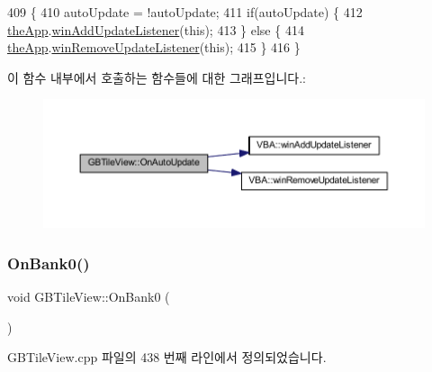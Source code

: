 \begin{DoxyCode}
409 \{
410   autoUpdate = !autoUpdate;
411   \textcolor{keywordflow}{if}(autoUpdate) \{
412     \mbox{\hyperlink{_v_b_a_8cpp_a8095a9d06b37a7efe3723f3218ad8fb3}{theApp}}.\mbox{\hyperlink{class_v_b_a_af0712f70a90d023ab8327a366be08174}{winAddUpdateListener}}(\textcolor{keyword}{this});
413   \} \textcolor{keywordflow}{else} \{
414     \mbox{\hyperlink{_v_b_a_8cpp_a8095a9d06b37a7efe3723f3218ad8fb3}{theApp}}.\mbox{\hyperlink{class_v_b_a_a2d31a0656df2230310aa8dc9e3a735d3}{winRemoveUpdateListener}}(\textcolor{keyword}{this});    
415   \}  
416 \}
\end{DoxyCode}
이 함수 내부에서 호출하는 함수들에 대한 그래프입니다.\+:
\nopagebreak
\begin{figure}[H]
\begin{center}
\leavevmode
\includegraphics[width=350pt]{class_g_b_tile_view_ad31fb32f27279e00c296717013144d33_cgraph}
\end{center}
\end{figure}
\mbox{\label{class_g_b_tile_view_a35e281e40e9fd8867f04a01595f54ef2}} 
\subsubsection{\texorpdfstring{On\+Bank0()}{OnBank0()}}
{\footnotesize\ttfamily void G\+B\+Tile\+View\+::\+On\+Bank0 (\begin{DoxyParamCaption}{ }\end{DoxyParamCaption})\hspace{0.3cm}{\ttfamily [protected]}}



G\+B\+Tile\+View.\+cpp 파일의 438 번째 라인에서 정의되었습니다.


